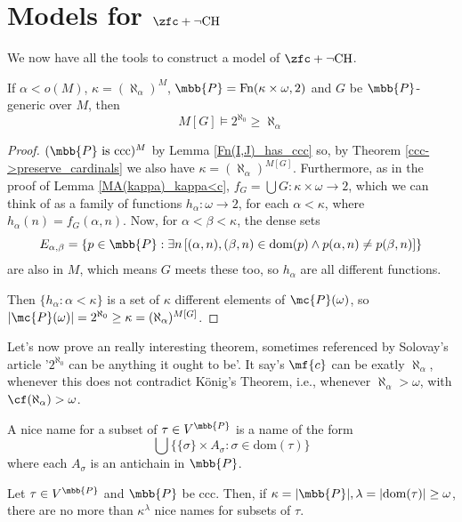 \section{Models for \texorpdfstring{$\zfc+\neg\text{CH}$}{zfc+negch}}

We now have all the tools to construct a model of $\zfc+\neg\text{CH}$.

\begin{lemma}{}{}\label{lower_bound_nch}
    If $\alpha<o(M)$, $\kappa=(\aleph_\alpha)^M$, $\mbb{P}=\text{Fn}(\kappa\times\omega,2)$ and $G$ be $\mbb{P}$-generic over $M$, then
    $$M[G]\vDash2^{\aleph_0}\geq\aleph_\alpha$$
\end{lemma}

\begin{proof}
    $(\mbb{P}\text{ is ccc})^M$ by Lemma \ref{Fn(I,J)_has_ccc} so, by Theorem \ref{ccc->preserve_cardinals} we also have $\kappa=(\aleph_\alpha)^{M[G]}$. Furthermore, as in the proof of Lemma \ref{MA(kappa)_kappa<c}, $f_G=\bigcup G:\kappa\times\omega\to 2$, which we can think of as a family of functions $h_\alpha:\omega\to 2$, for each $\alpha<\kappa$, where $h_\alpha(n)=f_G(\alpha,n)$. Now, for $\alpha<\beta<\kappa$, the dense sets
    $$E_{\alpha,\beta}=\{p\in\mbb{P}:\exists n\,[(\alpha,n),(\beta,n)\in\text{dom}(p)\wedge p(\alpha,n)\neq p(\beta,n)]\}$$
    are also in $M$, which means $G$ meets these too, so $h_\alpha$ are all different functions.

    Then $\{h_\alpha:\alpha<\kappa\}$ is a set of $\kappa$ different elements of $\mc{P}(\omega)$, so $\lvert\mc{P}(\omega)\rvert=2^{\aleph_0}\geq\kappa=(\aleph_\alpha)^{M[G]}$.
\end{proof}

Let's now prove an really interesting theorem, sometimes referenced by Solovay's article '$2^{\aleph_0}$ can be anything it ought to be'. It say's $\mf{c}$ can be exatly $\aleph_\alpha$, whenever this does not contradict König's Theorem, i.e., whenever $\aleph_\alpha>\omega$, with $\cf(\aleph_\alpha)>\omega$.

\begin{definition}{}{}
    A nice name for a subset of $\tau\in V^{\mbb{P}}$ is a name of the form
    $$\bigcup\{\{\sigma\}\times A_\sigma:\sigma\in\text{dom}(\tau)\}$$
    where each $A_\sigma$ is an antichain in $\mbb{P}$.
\end{definition}

\begin{lemma}{}{}
    Let $\tau\in V^{\mbb{P}}$ and $\mbb{P}$ be ccc. Then, if $\kappa=\lvert\mbb{P}\rvert,\lambda=\lvert\text{dom}(\tau)\rvert\geq\omega$, there are no more than $\kappa^\lambda$ nice names for subsets of $\tau$.
\end{lemma}

